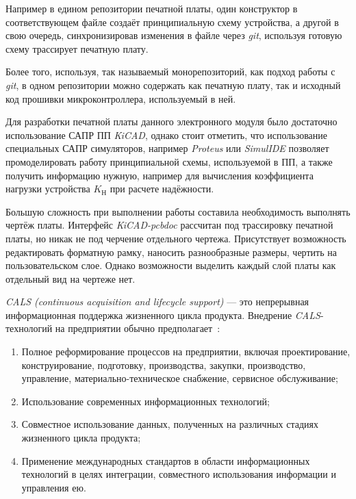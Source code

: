 Например в едином репозитории печатной платы, один конструктор в
соответствующем файле создаёт принципиальную схему устройства, а
другой в свою очередь, синхронизировав изменения в файле через
\textit{git}, используя готовую схему трассирует печатную плату.

Более того, используя, так называемый монорепозиторий, как подход
работы с \textit{git}, в одном репозитории можно содержать как
печатную плату, так и исходный код прошивки микроконтроллера,
используемый в ней.

Для разработки печатной платы данного электронного модуля было
достаточно использование САПР ПП \textit{KiCAD}, однако стоит
отметить, что использование специальных САПР симуляторов,
например \textit{Proteus} или \textit{SimulIDE}
позволяет промоделировать работу принципиальной схемы,
используемой в ПП, а также получить информацию
нужную, например для вычисления коэффициента нагрузки устройства
$K_{\textrm{Н}}$ при расчете надёжности.

Большую сложность при выполнении работы составила необходимость
выполнять чертёж платы.
Интерфейс \textit{KiCAD-pcbdoc} рассчитан под трассировку печатной
платы, но никак не под черчение отдельного чертежа.  Присутствует
возможность редактировать форматную рамку, наносить разнообразные
размеры, чертить на пользовательском слое.
Однако возможности выделить каждый слой платы как отдельный вид на
чертеже нет.

\textit{CALS (continuous acquisition and lifecycle support) } — это
непрерывная информационная поддержка жизненного цикла продукта.
Внедрение \textit{CALS}-технологий на предприятии обычно
предполагает~\cite{Lanin2019}:
\begin{enumerate}
\item Полное реформирование процессов на предприятии, включая
проектирование, конструирование, подготовку, производства, закупки,
производство, управление, материально-техническое снабжение, сервисное
обслуживание;

\item Использование современных информационных технологий;
  
\item Совместное использование данных, полученных на различных стадиях
  жизненного цикла продукта;
  
\item Применение международных стандартов в области информационных
технологий в целях интеграции, совместного использования информации и
управления ею.
\end{enumerate}


